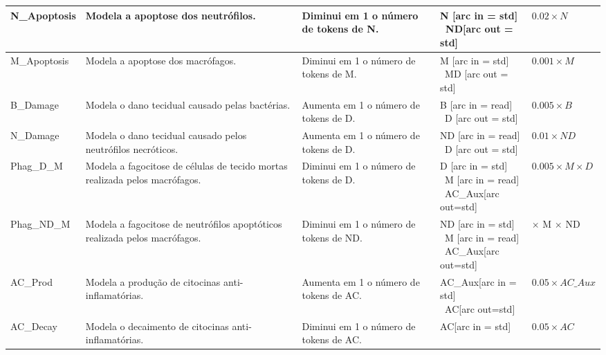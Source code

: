 \begin{center}
\begin{longtable}{
				>{\centering\arraybackslash}m{2cm}|
				m{4.23cm}|
				>{\centering\arraybackslash}m{3cm}|
				m{3cm}|
				>{\centering\arraybackslash}m{2.5cm}
			}
			N\_Apoptosis & 
			Modela a apoptose dos neutrófilos. & 
			Diminui em 1 o número de tokens de N. & 
			\parbox{3cm}{N [arc in = std]\\\ ND[arc out = std]} & 
			$0.02 \times N$ \\ \hline
			
			M\_Apoptosis & Modela a apoptose dos macrófagos. & 
			Diminui em 1 o número de tokens de M. & 
			\parbox{3cm}{M [arc in = std]\\\ MD [arc out = std]} & 
			$0.001 \times M$ \\	\hline
			
			B\_Damage & 
			Modela o dano tecidual causado pelas bactérias. & 
			Aumenta em 1 o número de tokens de D. & 
			\parbox{3cm}{B [arc in = read]\\\ D [arc out = std]} & 
			$0.005 \times B$ \\ \hline
			
			N\_Damage & 
			Modela o dano tecidual causado pelos neutrófilos necróticos. & 
			Aumenta em 1 o número de tokens de D. & 
			\parbox{3cm}{ND [arc in = read]\\\ D [arc out = std]} & 
			$0.01 \times ND$ \\ \hline
			
			Phag\_D\_M & 
			Modela a fagocitose de células de tecido mortas realizada pelos macrófagos. & 
			Diminui em 1 o número de tokens de D. & 
			\parbox{3cm}{D [arc in = std]\\\ M [arc in = read] \\\ AC\_Aux[arc out=std]} & 
			$0.005 \times M \times D$ \\ \hline
			
			Phag\_ND\_M & 
			Modela a fagocitose de neutrófilos apoptóticos realizada pelos macrófagos. & 
			Diminui em 1 o número de tokens de ND. & 
			\parbox{3cm}{ND [arc in = std]\\\ M [arc in = read] \\\ AC\_Aux[arc out=std]} & 
			0.05 $\times$ M $\times$ ND \\ \hline
			
			AC\_Prod & 
			Modela a produção de citocinas anti-inflamatórias. & 
			Aumenta em 1 o número de tokens de AC. & 
			\parbox{3cm}{AC\_Aux[arc in = std] \\\ AC[arc out=std]} & 
			$0.05 \times AC\_Aux$ \\\hline
			
			AC\_Decay & 
			Modela o decaimento de citocinas anti-inflamatórias. & 
			Diminui em 1 o número de tokens de AC. & 
			\parbox{3cm}{AC[arc in = std]} & 
			$0.05 \times AC$ \\
			
		\end{longtable}
	\end{center}
\endgroup


